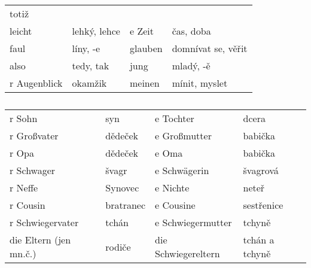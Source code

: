 \begin{widetext}
\begin{tabular}{llll}
          totiž                 \\
          leicht             & lehký, lehce          & e Zeit          & čas, 
          doba             \\
          faul               & líny, -e              & glauben         & domnívat se, 
          věřit    \\
          also               & tedy, tak             & jung            & mladý, 
          -ě             \\
          r Augenblick       & okamžik               & meinen          & mínit, 
          myslet         \\
        \hline
       \end{tabular}
     \end{widetext}
    
    \begin{table}[ht!] %
      \begin{tabular}{llll} 
        \hline 
        r Sohn            & syn        & e Tochter     & dcera        \\
        r Großvater       & dědeček    & e Großmutter  & babička      \\
        r Opa             & dědeček    & e Oma         & babička      \\
        r Schwager        & švagr      & e Schwägerin  & švagrová     \\
        r Neffe           & Synovec    & e Nichte      & neteř        \\
        r Cousin          & bratranec  & e Cousine     & sestřenice   \\
        r Schwiegervater  & tchán & e Schwiegermutter  & tchyně       \\
        die Eltern (jen mn.č.)    & rodiče  & die Schwiegereltern  & tchán a tchyně  \\
        \hline
      \end{tabular}
      \caption*{ }
    \end{table}
